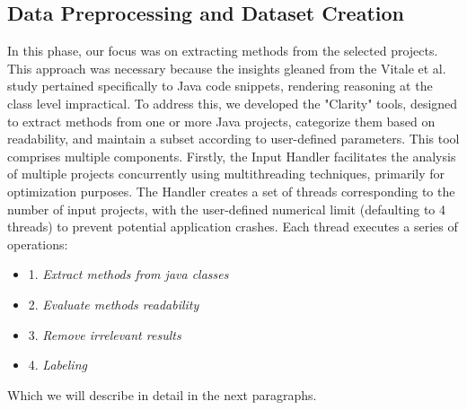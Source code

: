 \subsection{Data Preprocessing and Dataset Creation}
In this phase, our focus was on extracting methods from the selected projects. This approach was necessary because the insights gleaned from the Vitale et al. \cite{Vitale2023} study pertained specifically to Java code snippets, rendering reasoning at the class level impractical. To address this, we developed the "Clarity" tools, designed to extract methods from one or more Java projects, categorize them based on readability, and maintain a subset according to user-defined parameters. This tool comprises multiple components. Firstly, the Input Handler facilitates the analysis of multiple projects concurrently using multithreading techniques, primarily for optimization purposes. The Handler creates a set of threads corresponding to the number of input projects, with the user-defined numerical limit (defaulting to 4 threads) to prevent potential application crashes. Each thread executes a series of operations:

\begin{itemize}
	\item 1. \textit{Extract methods from java classes}
	\item 2. \textit{Evaluate methods readability }
	\item 3. \textit{Remove irrelevant results}
	\item 4. \textit{Labeling}
\end{itemize}
Which we will describe in detail in the next paragraphs.



